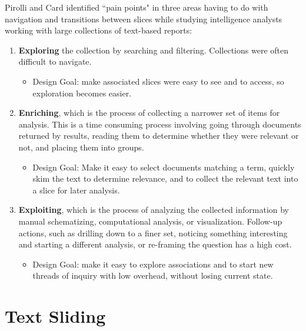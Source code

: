 \documentclass{sig-alternate}
\newcommand{\strong}[1] {\textbf{#1}}
\begin{document}
Pirolli and Card \cite{pirolli_sensemaking_2005} identified ``pain points" in three areas having to do with navigation and transitions between slices while studying intelligence analysts working with large collections of text-based reports:
\begin{enumerate}
\item \strong{Exploring} the collection by searching and filtering. Collections were often difficult to navigate. 
	\begin{itemize}
		\item Design Goal: make associated slices were easy to see and to access, so exploration  becomes easier. 
	\end{itemize}
\item \strong{Enriching}, which is the process of collecting a narrower set of items for analysis. This is a time consuming process involving going through documents returned by results, reading them to determine whether they were relevant or not, and placing them into groups.
	\begin{itemize}
		\item Design Goal: Make it easy to select documents matching a term, quickly skim the text to determine relevance, and to collect the relevant text into a slice for later analysis.
	\end{itemize}
\item \strong{Exploiting}, which is the process of analyzing the collected information by manual schematizing, computational analysis, or visualization. Follow-up actions, such as drilling down to a finer set, noticing something interesting and starting a different analysis, or re-framing the question has a high cost.
	\begin{itemize}
		\item Design Goal: make it easy to explore associations and to start new threads of inquiry with low overhead,  without losing current state.
	\end{itemize}
\end{enumerate}




\section{Text Sliding}
\end{document}

